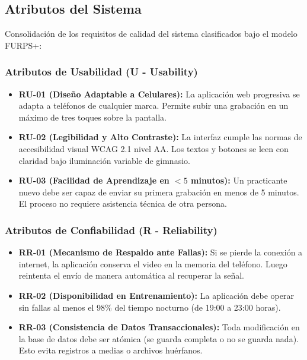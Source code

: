 \documentclass[12pt,letterpaper]{article}
\begin{document}
\subsection{Atributos del Sistema}

Consolidación de los requisitos de calidad del sistema clasificados bajo el modelo FURPS+:

\subsubsection{Atributos de Usabilidad (U - Usability)}
\begin{itemize}
    \item \textbf{RU-01 (Diseño Adaptable a Celulares):} La aplicación web progresiva se adapta a teléfonos de cualquier marca. Permite subir una grabación en un máximo de tres toques sobre la pantalla.
    \item \textbf{RU-02 (Legibilidad y Alto Contraste):} La interfaz cumple las normas de accesibilidad visual WCAG 2.1 nivel AA. Los textos y botones se leen con claridad bajo iluminación variable de gimnasio.
    \item \textbf{RU-03 (Facilidad de Aprendizaje en $<5$ minutos):} Un practicante nuevo debe ser capaz de enviar su primera grabación en menos de 5 minutos. El proceso no requiere asistencia técnica de otra persona.
\end{itemize}

\subsubsection{Atributos de Confiabilidad (R - Reliability)}
\begin{itemize}
    \item \textbf{RR-01 (Mecanismo de Respaldo ante Fallas):} Si se pierde la conexión a internet, la aplicación conserva el video en la memoria del teléfono. Luego reintenta el envío de manera automática al recuperar la señal.
    \item \textbf{RR-02 (Disponibilidad en Entrenamiento):} La aplicación debe operar sin fallas al menos el 98\% del tiempo nocturno (de 19:00 a 23:00 horas).
    \item \textbf{RR-03 (Consistencia de Datos Transaccionales):} Toda modificación en la base de datos debe ser atómica (se guarda completa o no se guarda nada). Esto evita registros a medias o archivos huérfanos.
\end{itemize}
\end{document}
